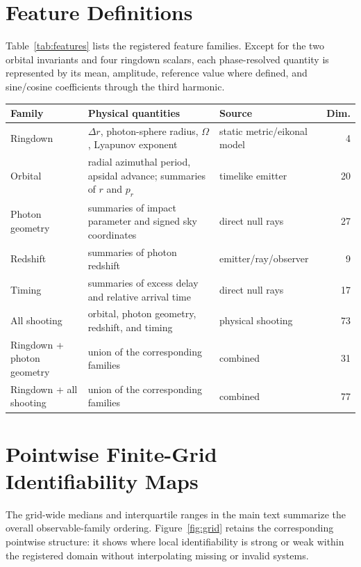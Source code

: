 \documentclass[11pt]{article}
\begin{document}
\section{Feature Definitions}
\label{app:features}
Table~\ref{tab:features} lists the registered feature families. Except for the
two orbital invariants and four ringdown scalars, each phase-resolved quantity
is represented by its mean, amplitude, reference value where defined, and
sine/cosine coefficients through the third harmonic.

\begin{center}
\begin{minipage}{.96\textwidth}
\label{tab:features}
\centering
\scriptsize
\setlength{\tabcolsep}{3pt}
\begin{tabular}{p{.23\linewidth}p{.43\linewidth}p{.18\linewidth}r}
Family & Physical quantities & Source & Dim. \\
\hline
Ringdown & $\Delta r$, photon-sphere radius, $\Omega$, Lyapunov exponent & static metric/eikonal model & 4 \\
Orbital & radial azimuthal period, apsidal advance; summaries of $r$ and $p_r$ & timelike emitter & 20 \\
Photon geometry & summaries of impact parameter and signed sky coordinates & direct null rays & 27 \\
Redshift & summaries of photon redshift & emitter/ray/observer & 9 \\
Timing & summaries of excess delay and relative arrival time & direct null rays & 17 \\
All shooting & orbital, photon geometry, redshift, and timing & physical shooting & 73 \\
Ringdown + photon geometry & union of the corresponding families & combined & 31 \\
Ringdown + all shooting & union of the corresponding families & combined & 77 \\
\end{tabular}
\end{minipage}
\end{center}

\section{Pointwise Finite-Grid Identifiability Maps}
\label{app:grid-maps}
The grid-wide medians and interquartile ranges in the main text summarize the
overall observable-family ordering. Figure~\ref{fig:grid} retains the
corresponding pointwise structure: it shows where local identifiability is
strong or weak within the registered domain without interpolating missing or
invalid systems.
\end{document}
